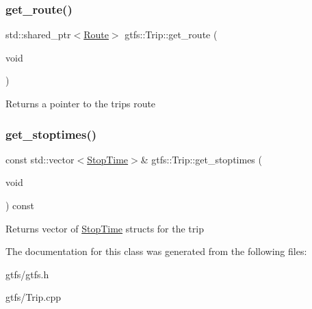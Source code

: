\subsubsection{\texorpdfstring{get\+\_\+route()}{get\_route()}}
{\footnotesize\ttfamily std\+::shared\+\_\+ptr$<$\hyperlink{classgtfs_1_1Route}{Route}$>$ gtfs\+::\+Trip\+::get\+\_\+route (\begin{DoxyParamCaption}\item[{void}]{ }\end{DoxyParamCaption})\hspace{0.3cm}{\ttfamily [inline]}}

\begin{DoxyReturn}{Returns}
a pointer to the trip\textquotesingle{}s route 
\end{DoxyReturn}
\mbox{\label{classgtfs_1_1Trip_a6b9d68b9d1c6942b839cd8599ed6a339}} 
\subsubsection{\texorpdfstring{get\+\_\+stoptimes()}{get\_stoptimes()}}
{\footnotesize\ttfamily const std\+::vector$<$\hyperlink{structgtfs_1_1StopTime}{Stop\+Time}$>$\& gtfs\+::\+Trip\+::get\+\_\+stoptimes (\begin{DoxyParamCaption}\item[{void}]{ }\end{DoxyParamCaption}) const\hspace{0.3cm}{\ttfamily [inline]}}

\begin{DoxyReturn}{Returns}
vector of \hyperlink{structgtfs_1_1StopTime}{Stop\+Time} structs for the trip 
\end{DoxyReturn}


The documentation for this class was generated from the following files\+:\begin{DoxyCompactItemize}
\item 
gtfs/gtfs.\+h\item 
gtfs/Trip.\+cpp\end{DoxyCompactItemize}
